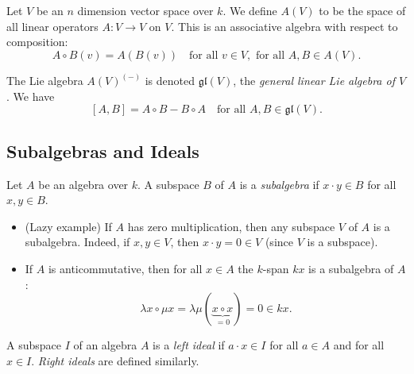 \begin{definition}
	Let $V$ be an $n$ dimension vector space over $k$. We define $A(V)$ to be the space of all linear operators $A : V \to V$ on $V$. This is an associative algebra with respect to composition:
	\[
		A \circ B(v) = A(B(v)) \quad \text{for all } v \in V, \text{ for all } A, B \in A(V).
	\]
\end{definition}

\begin{definition}
	The Lie algebra $A(V)^{(-)}$ is denoted $\mathfrak{gl}(V)$, the \emph{general linear Lie algebra of $V$}. We have
	\[
		[A, B] = A \circ B - B \circ A \quad \text{for all } A, B \in \mathfrak{gl}(V).
	\]
\end{definition}

\subsection{Subalgebras and Ideals}
\begin{definition}
	Let $A$ be an algebra over $k$. A subspace $B$ of $A$ is a \emph{subalgebra} if $x \cdot y \in B$ for all $x, y \in B$.
\end{definition}

\begin{example}\hfill
	\begin{itemize}
		\item (Lazy example) If $A$ has zero multiplication, then any subspace $V$ of $A$ is a subalgebra. Indeed, if $x, y \in V$, then $x \cdot y = 0 \in V$ (since $V$ is a subspace).
		\item If $A$ is anticommutative, then for all $x \in A$ the $k$-span $kx$ is a subalgebra of $A$:
		\[
			\lambda x \circ \mu x = \lambda\mu(\underbrace{x \circ x}_{= 0}) = 0 \in kx.
		\]
	\end{itemize}
\end{example}

\begin{definition}
	A subspace $I$ of an algebra $A$ is a \emph{left ideal} if $a \cdot x \in I$ for all $a \in A$ and for all $x \in I$. \emph{Right ideals} are defined similarly.
\end{definition}

